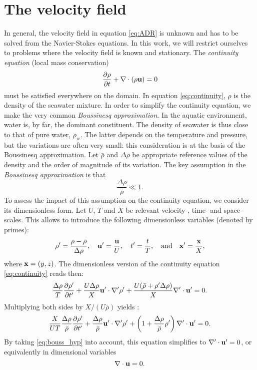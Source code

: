 \section{The velocity field}
In general, the velocity field in equation \eqref{eq:ADR} is unknown and has to be solved from the Navier-Stokes equations. In this work, we will restrict ourselves to problems where the velocity field is known and stationary. The \textit{continuity equation} (local mass conservation)
\begin{equation} \label{eq:continuity}
	\frac{\partial \rho}{\partial t} + \nabla \cdot (\rho \mathbf u) = 0
\end{equation}
must be satisfied everywhere on the domain. In equation \eqref{eq:continuity}, $\rho$ is the density of the seawater mixture. In order to simplify the continuity equation, we make the very common \textit{Boussinesq approximation}. In the aquatic environment, water is, by far, the dominant constituent. The density of seawater is thus close to that of pure water, $\rho_w$. The latter depends on the temperature and pressure, but the variations are often very small: this consideration is at the basis of the Boussinesq approximation. Let $\bar{\rho}$ and $\Delta\rho$ be appropriate reference values of the density and the order of magnitude of its variation. The key assumption in the \textit{Boussinesq approximation} is that
\begin{equation} \label{eq:bouss_hyp}
	\frac{\Delta \rho}{\bar{\rho}} \ll 1.
\end{equation}
To assess the impact of this assumption on the continuity equation, we consider its dimensionless form. Let $U$, $T$ and $X$ be relevant velocity-, time- and space-scales. This allows to introduce the following dimensionless variables (denoted by primes):
\begin{equation}
	\rho' = \frac{\rho - \bar{\rho}}{\Delta \rho}, \quad \mathbf u' = \frac{\mathbf u}{U}, \quad t' = \frac{t}{T}, \quad \mbox{and} \quad \mathbf x' = \frac{\mathbf x}{X},
\end{equation}
where $\mathbf x = (y,z)$. The dimensionless version of the continuity equation \eqref{eq:continuity} reads then: 
\begin{equation}
	\frac{\Delta \rho}{T}\frac{\partial \rho'}{\partial t'} + \frac{U\Delta \rho}{X}\mathbf u' \cdot \nabla' \rho' + \frac{U(\bar{\rho}+ \rho' \Delta \rho)}{X}\nabla' \cdot \mathbf u' = 0.
\end{equation}
Multiplying both sides by $X/(U\bar{\rho})$ yields :
\begin{equation}
	\frac{X}{UT}\frac{\Delta \rho}{\bar{\rho}}\frac{\partial \rho'}{\partial t'} + \frac{\Delta \rho}{\bar{\rho}}\mathbf u' \cdot \nabla' \rho' + \left(1+\frac{\Delta \rho}{\bar{\rho}}\rho'\right)\nabla' \cdot \mathbf u' = 0.
\end{equation}
By taking \eqref{eq:bouss_hyp} into account, this equation simplifies to $\nabla' \cdot \mathbf u' = 0$, or equivalently in dimensional variables 
\begin{equation}
	\nabla \cdot \mathbf u = 0.
\end{equation}

